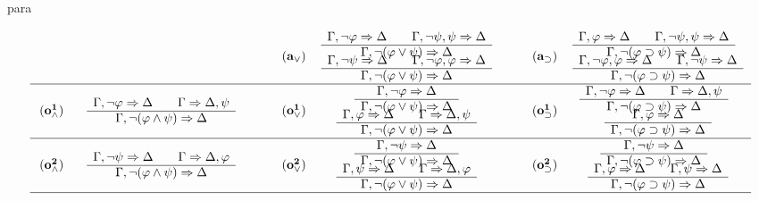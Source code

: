 \begin{entry}{para}
\begin{calculus}
\[\begin{tabular}{ccc@{\hspace{2em}}ccc@{\hspace{2em}}cc}
\vspace{-1.5em}
    & &&  &  $\drul{,\neg\vfi}{}{,\neg\psi,\psi}{}{,\neg     (\vfi\vee\psi)}{}$ && &  $\drul{,\vfi}{}{,\neg\psi,\psi}{}{,\neg    (\vfi\su\psi)}{}$ \ \  \\
\vspace{-1.5em}
\phantom{${\name{a_\wedge}}$ }
  &
  \phantom{$\drul{,\neg \vfi}{}{,\neg\psi}{}{,\neg  (\vfi\w\psi)}{}$ }
  &&
 ${\name{a_\vee}}$ & &&   ${\name{a_\su}}$  & \ \ \\
  &&&&  $\drul{,\neg\psi}{}{,\neg\vfi,\vfi}{}{,\neg(\vfi\vee\psi)}{}$ &&   &    $\drul{,\neg\vfi,\vfi}{}{,\neg\psi}{}{,\neg      (\vfi\su\psi)}{}$ \\\hline

\vspace{-1.5em}
&&&&   $\srul{,\neg \vfi}{}{,\neg (\vfi\vee\psi)}{}$   &&& $\drul{,\neg \vfi}{}{}{,\psi}{,\neg (\vfi\su\psi)}{}$  \ \ \\
\vspace{-1.5em}
 ${\name{o^{1}_\w}}$ &  $\drul{,\neg \vfi}{}{}{,\psi}{,\neg (\vfi\w\psi)}{}$ &&
 ${\name{o^{1}_\vee}}$ &&& ${\name{o^{1}_\su}}$ & \ \ \\
 &&&&  $\drul{,\vfi}{}{}{,\psi}{,\neg (\vfi\vee\psi)}{}$ &&&
 $\srul{,\vfi}{}{,\neg (\vfi\su\psi)}{}$ \\\hline



\vspace{-1.5em}
&&&& $\srul{,\neg \psi}{}{,\neg (\vfi\vee\psi)}{}$ &&&   $\srul{,\neg \psi}{}{,\neg (\vfi\su\psi)}{}$ \ \ \\
\vspace{-1.5em}
 ${\name{o^{2}_\w}}$ &  $\drul{,\neg \psi}{}{}{,\vfi}{,\neg (\vfi\w\psi)}{}$ &&
 ${\name{o^{2}_\vee}}$ &&&
 ${\name{o^{2}_\su}}$ & \ \ \\
 &&&& $\drul{,\psi}{}{}{,\vfi}{,\neg (\vfi\vee\psi)}{}$ &&&$\drul{,\vfi}{}{,\psi}{}{,\neg (\vfi\su\psi)}{}$\\\hline



 \end{tabular}\]
\normalsize
\end{calculus}



\end{entry}
